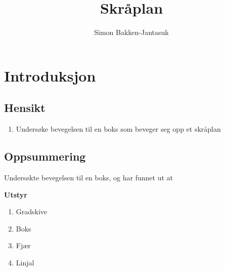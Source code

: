 \documentclass[a4paper]{article}
\title{Skråplan}
\author{Simon Bakken-Jantasuk}
\begin{document}
\maketitle

\tableofcontents

\listoftables

\pagebreak

\section{Introduksjon} %
\label{sec:introduksjon}
\subsection{Hensikt} %
\label{sub:hensikt}
\begin{flushleft}
	\begin{enumerate}
		\item Undersøke bevegelsen til en boks som beveger seg opp et skråplan
	\end{enumerate}
\end{flushleft}
\subsection{Oppsummering} %
Undersøkte bevegelsen til en boks, og har funnet ut at 
\label{sub:oppsummering}

\textbf{Utstyr} 
\begin{enumerate}
	\item Gradskive
	\item Boks
	\item Fjær
	\item Linjal
\end{enumerate}
\end{document}
